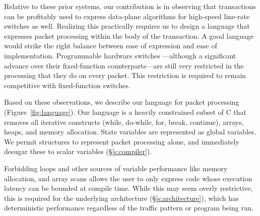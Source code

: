 Relative to these prior systems, our contribution is in observing that
transactions can be profitably used to express data-plane algorithms for
high-speed line-rate switches as well. Realizing this practically requires us
to design a language that expresses packet processing within the body of the
transaction. A good language would strike the right balance between ease of
expression and ease of implementation. Programmable hardware switches
---although a significant advance over their fixed-function counterparts---are
still very restricted in the processing that they do on every packet. This
restriction is required to remain competitive with fixed-function switches.

Based on these observations, we describe our language for packet processing
(Figure~\ref{fig:language}). Our language is a heavily constrained subset of C
that removes all iterative constructs (while, do-while, for, break, continue),
arrays, heaps, and memory allocation. State variables are represented as global
variables. We permit structures to represent packet processing alone, and immediately
desugar these to scalar variables (\S\ref{s:compiler}).

Forbidding loops and other sources of variable performance like memory
allocation, and array scans allows the user to only express code whose
execution latency can be bounded at compile time.  While this may seem overly
restrictive, this is required for the underlying architecture
(\S\ref{s:architecture}), which has deterministic performance regardless of the
traffic pattern or program being run.

\fi

